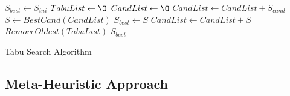 \begin{algorithm}[H]
\begin{algorithmic}[1]
\State $S_{best} \gets S_{ini}$
\State $TabuList \gets \O$
    \State $CandList \gets \O$
            \State $CandList \gets CandList + S_{cand}$
        \EndIf
    \EndFor
    \State $S \gets BestCand(CandList)$
        \State $S_{best} \gets S$
        \State $CandList \gets CandList + S$
		    \State $RemoveOldest(TabuList)$
		\EndWhile
    \EndIf
\EndWhile
\State \Return $S_{best}$
\EndFunction
\end{algorithmic}
\caption{Tabu Search Algorithm}
\label{alg:ga}
\end{algorithm}



\subsection{Meta-Heuristic Approach}

